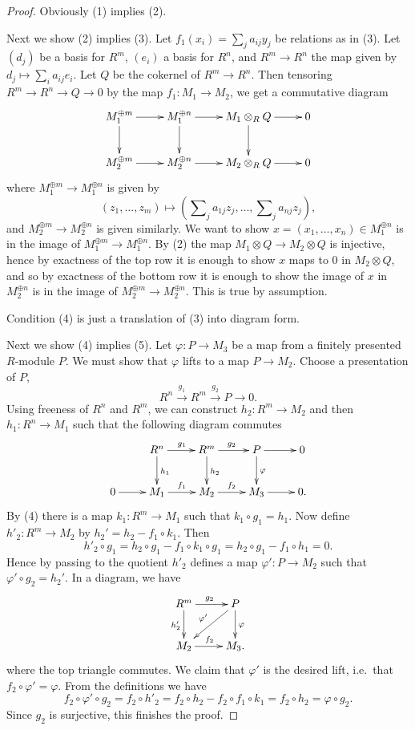 \documentclass{amsart}
\theoremstyle{plain}
\theoremstyle{definition}
\theoremstyle{remark}
\numberwithin{equation}{subsection}
\begin{document}
\begin{proof}
Obviously (1) implies (2).

\medskip\noindent
Next we show (2) implies (3).  Let $f_1(x_i) = \sum_j a_{ij} y_j$ be relations
as in (3).  Let $(d_j)$ be a basis for $R^m$, $(e_i)$ a basis for $R^n$, and
$R^m \to R^n$ the map given by $d_j \mapsto \sum_i a_{ij} e_i$.
Let $Q$ be the cokernel of $R^m \to R^n$.  Then tensoring
$R^m \to R^n \to Q \to 0$ by the map $f_1: M_1 \to M_2$, we get a
commutative diagram
$$
\xymatrix{
M_1^{\oplus m} \ar[r] \ar[d] & M_1^{\oplus n} \ar[r] \ar[d] & M_1 \otimes_R Q
\ar[r] \ar[d] & 0 \\
M_2^{\oplus m} \ar[r] & M_2^{\oplus n} \ar[r] & M_2 \otimes_R Q \ar[r] & 0
}
$$
where $M_1^{\oplus m} \to M_1^{\oplus n}$ is given by
$$
(z_1, \ldots, z_m) \mapsto
(\sum\nolimits_j a_{1j} z_j, \ldots, \sum\nolimits_j a_{nj} z_j),
$$
and $M_2^{\oplus m} \to M_2^{\oplus n}$ is given similarly.  We want to
show $x = (x_1, \ldots, x_n) \in M_1^{\oplus n}$ is in the image of $M_1^{\oplus
m} \to M_1^{\oplus n}$.  By (2) the map $M_1 \otimes Q \to M_2
\otimes Q$ is injective, hence by exactness of the top row it is enough to show
$x$ maps to $0$ in $M_2 \otimes Q$, and so by exactness of the bottom row it is
enough to show the image of $x$ in $M_2^{\oplus n}$ is in the image of
$M_2^{\oplus m} \to M_2^{\oplus n}$.  This is true by assumption.

\medskip\noindent
Condition (4) is just a translation of (3) into diagram form.

\medskip\noindent
Next we show (4) implies (5). Let $\varphi : P \to M_3$ be a map from a
finitely presented $R$-module $P$.  We must show that $\varphi$ lifts to a map
$P \to M_2$.  Choose a presentation of $P$,
$$
R^n \xrightarrow{g_1} R^m \xrightarrow{g_2} P \to 0.
$$
Using freeness of $R^n$ and $R^m$, we can construct $h_2: R^m \to M_2$
and then $h_1: R^n \to M_1$ such that the following diagram commutes
$$
\xymatrix{
         & R^n \ar[r]^{g_1} \ar[d]^{h_1} & R^m \ar[r]^{g_2} \ar[d]^{h_2} & P
\ar[r] \ar[d]^{\varphi} & 0 \\
0 \ar[r] & M_1 \ar[r]^{f_1} & M_2 \ar[r]^{f_2} & M_3 \ar[r] & 0 .
}
$$
By (4) there is a map $k_1: R^m \to M_1$ such that $k_1 \circ g_1 =
h_1$.  Now define $h'_2: R^m \to M_2$ by $h_2' = h_2 - f_1 \circ k_1$.
Then
$$
h'_2 \circ g_1 = h_2 \circ g_1 - f_1 \circ k_1 \circ g_1 =
h_2 \circ g_1 - f_1 \circ h_1 = 0 .
$$
Hence by passing to the quotient $h'_2$ defines a map $\varphi': P \to
M_2$ such that $\varphi' \circ g_2 = h_2'$.  In a diagram, we have
$$
\xymatrix{
R^m \ar[r]^{g_2} \ar[d]_{h'_2} & P \ar[d]^{\varphi} \ar[dl]_{\varphi'} \\
M_2 \ar[r]^{f_2} & M_3.
}
$$
where the top triangle commutes.  We claim that $\varphi'$ is the desired lift,
i.e.\ that $f_2 \circ \varphi' = \varphi$.  From the definitions we have
$$
f_2 \circ \varphi' \circ g_2 = f_2 \circ h'_2 =
f_2 \circ h_2 - f_2 \circ f_1 \circ k_1 = f_2 \circ h_2 =
\varphi \circ g_2.
$$
Since $g_2$ is surjective, this finishes the proof.


\end{proof}
\end{document}
